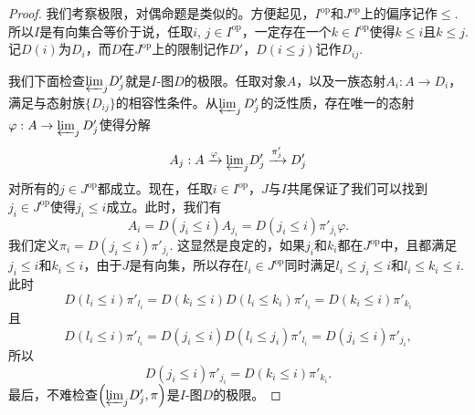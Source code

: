 \begin{proof}
我们考察极限，对偶命题是类似的。方便起见，$I^\text{op}$和$J^\text{op}$上的偏序记作$\leq$. 所以$I$是有向集合等价于说，任取$i$, $j\in I^\text{op}$，一定存在一个$k\in I^\text{op}$使得$k\leq i$且$k\leq j$. 记$D(i)$为$D_i$，而$D$在$J^\text{op}$上的限制记作$D'$，$D(i\leq j)$记作$D_{ij}$. 

我们下面检查${\varprojlim}_j D'_j$就是$I$-图$D$的极限。任取对象$A$，以及一族态射$A_i:A\to D_i$，满足与态射族$\{D_{ij}\}$的相容性条件。从$\varprojlim_j D'_j$的泛性质，存在唯一的态射$\varphi:A\to \varprojlim_j D'_j$使得分解
\[
	A_j:A\xrightarrow{\varphi}{\varprojlim}_j D'_j\xrightarrow{\pi'_j} D'_j
\]
对所有的$j\in J^\text{op}$都成立。现在，任取$i\in I^\text{op}$，$J$与$I$共尾保证了我们可以找到$j_i\in J^\text{op}$使得$j_i\leq i$成立。此时，我们有
\[
	A_i=D(j_i\leq i)A_{j_i}=D(j_i\leq i)\pi'_{j_i}\varphi.
\]
我们定义$\pi_i=D(j_i\leq i)\pi'_{j_i}$. 这显然是良定的，如果$j_i$和$k_i$都在$J^\text{op}$中，且都满足$j_i\leq i$和$k_i\leq i$，由于$J$是有向集，所以存在$l_i\in J^\text{op}$同时满足$l_i\leq j_i\leq i$和$l_i\leq k_i \leq i$. 此时
\[
	D(l_i\leq i)\pi'_{l_i}=D(k_i\leq i)D(l_i\leq k_i)\pi'_{l_i}=D(k_i\leq i)\pi'_{k_i}
\]
且
\[
	D(l_i\leq i)\pi'_{l_i}=D(j_i\leq i)D(l_i\leq j_i)\pi'_{l_i}=D(j_i\leq i)\pi'_{j_i},
\]
所以
\[
	D(j_i\leq i)\pi'_{j_i}=D(k_i\leq i)\pi'_{k_i}.
\]
最后，不难检查$\left({\varprojlim}_j D'_j,\pi\right)$是$I$-图$D$的极限。
\end{proof}




